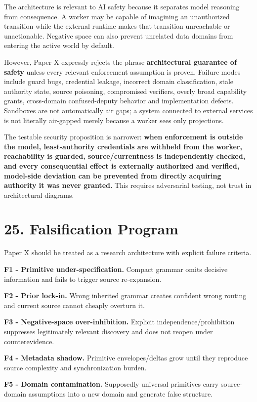 \documentclass[
  10pt,
  letterpaper,
]{article}
\begin{document}
The architecture is relevant to AI safety because it separates model
reasoning from consequence. A worker may be capable of imagining an
unauthorized transition while the external runtime makes that transition
unreachable or unactionable. Negative space can also prevent unrelated
data domains from entering the active world by default.

However, Paper X expressly rejects the phrase \textbf{architectural
guarantee of safety} unless every relevant enforcement assumption is
proven. Failure modes include guard bugs, credential leakage, incorrect
domain classification, stale authority state, source poisoning,
compromised verifiers, overly broad capability grants, cross-domain
confused-deputy behavior and implementation defects. Sandboxes are not
automatically air gaps; a system connected to external services is not
literally air-gapped merely because a worker sees only projections.

The testable security proposition is narrower: \textbf{when enforcement
is outside the model, least-authority credentials are withheld from the
worker, reachability is guarded, source/currentness is independently
checked, and every consequential effect is externally authorized and
verified, model-side deviation can be prevented from directly acquiring
authority it was never granted.} This requires adversarial testing, not
trust in architectural diagrams.

\section{25. Falsification Program}\label{25-falsification-program}

Paper X should be treated as a research architecture with explicit
failure criteria.

\textbf{F1 - Primitive under-specification.} Compact grammar omits
decisive information and fails to trigger source re-expansion.

\textbf{F2 - Prior lock-in.} Wrong inherited grammar creates confident
wrong routing and current source cannot cheaply overturn it.

\textbf{F3 - Negative-space over-inhibition.} Explicit
independence/prohibition suppresses legitimately relevant discovery and
does not reopen under counterevidence.

\textbf{F4 - Metadata shadow.} Primitive envelopes/deltas grow until
they reproduce source complexity and synchronization burden.

\textbf{F5 - Domain contamination.} Supposedly universal primitives
carry source-domain assumptions into a new domain and generate false
structure.
\end{document}

